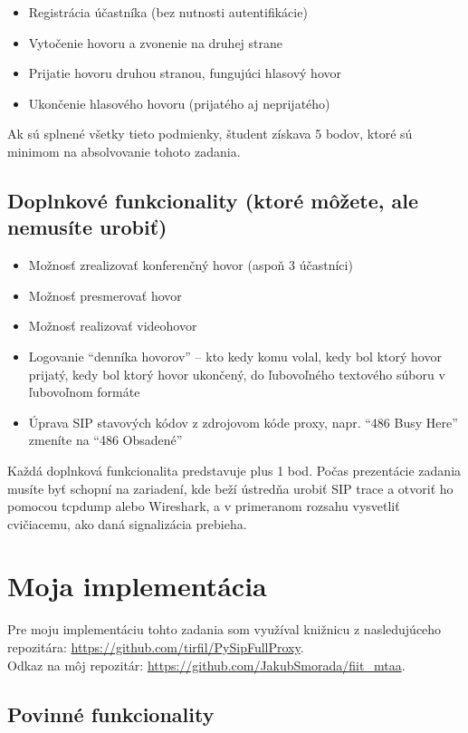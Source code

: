 \begin{itemize}
	\item Registrácia účastníka (bez nutnosti autentifikácie)
	\item Vytočenie hovoru a zvonenie na druhej strane
	\item Prijatie hovoru druhou stranou, fungujúci hlasový hovor
	\item Ukončenie hlasového hovoru (prijatého aj neprijatého)
\end{itemize}

Ak sú splnené všetky tieto podmienky, študent získava 5 bodov, ktoré sú minimom na absolvovanie tohoto zadania.

\subsection{Doplnkové funkcionality (ktoré môžete, ale nemusíte urobiť)}

\begin{itemize}
	\item Možnosť zrealizovať konferenčný hovor (aspoň 3 účastníci)
	\item Možnosť presmerovať hovor
	\item Možnosť realizovať videohovor
	\item Logovanie “denníka hovorov” – kto kedy komu volal, kedy bol ktorý hovor prijatý, kedy bol ktorý hovor ukončený, do ľubovoľného textového súboru v ľubovoľnom formáte
	\item Úprava SIP stavových kódov z zdrojovom kóde proxy, napr. “486 Busy Here” zmeníte na “486
	Obsadené”
\end{itemize}

Každá doplnková funkcionalita predstavuje plus 1 bod.
Počas prezentácie zadania musíte byť schopní na zariadení, kde beží ústredňa urobiť SIP trace a otvoriť ho pomocou tcpdump alebo Wireshark, a v primeranom rozsahu vysvetliť cvičiacemu, ako daná signalizácia prebieha.

\section{Moja implementácia}

Pre moju implementáciu tohto zadania som využíval knižnicu z nasledujúceho repozitára: \url{https://github.com/tirfil/PySipFullProxy}. 
\\Odkaz na môj repozitár: \url{https://github.com/JakubSmorada/fiit_mtaa}.
\
\subsection{Povinné funkcionality}
